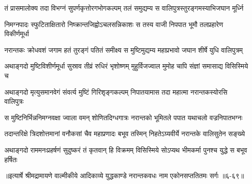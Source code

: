 \twolineshloka
{तं प्रासमालोक्य तदा विभग्नं सुपर्णकृत्तोरगभोगकल्पम्}
{तलं समुद्यम्य स वालिपुत्रस्तुरङ्गमस्याभिजघान मूर्ध्नि} %

\twolineshloka
{निमग्नपादः स्फुटिताक्षितारो निष्क्रान्तजिह्वोऽचलसन्निकाशः}
{स तस्य वाजी निपपात भूमौ तलप्रहारेण विकीर्णमूर्धा} %

\twolineshloka
{नरान्तकः क्रोधवशं जगाम हतं तुरङ्गं पतितं समीक्ष्य}
{स मुष्टिमुद्यम्य महाप्रभावो जघान शीर्षे युधि वालिपुत्रम्} %

\twolineshloka
{अथाङ्गदो मुष्टिविशीर्णमूर्धा सुस्राव तीव्रं रुधिरं भृशोष्णम्}
{मुहुर्विजज्वाल मुमोह चापि संज्ञां समासाद्य विसिस्मिये च} %

\twolineshloka
{अथाङ्गदो मृत्युसमानवेगं संवर्त्य मुष्टिं गिरिशृङ्गकल्पम्}
{निपातयामास तदा महात्मा नरान्तकस्योरसि वालिपुत्रः} %

\twolineshloka
{स मुष्टिनिर्भिन्ननिमग्नवक्षा ज्वाला वमन् शोणितदिग्धगात्रः}
{नरान्तको भूमितले पपात यथाचलो वज्रनिपातभग्नः} %

\twolineshloka
{तदान्तरिक्षे त्रिदशोत्तमानां वनौकसां चैव महाप्रणादः}
{बभूव तस्मिन् निहतेऽग्र्यवीर्ये नरान्तके वालिसुतेन सङ्ख्ये} %

\twolineshloka
{अथाङ्गदो राममनःप्रहर्षणं सुदुष्करं तं कृतवान् हि विक्रमम्}
{विसिस्मिये सोऽप्यथ भीमकर्मा पुनश्च युद्धे स बभूव हर्षितः} %


॥इत्यार्षे श्रीमद्रामायणे वाल्मीकीये आदिकाव्ये युद्धकाण्डे नरान्तकवधः नाम एकोनसप्ततितमः सर्गः ॥६-६९॥
